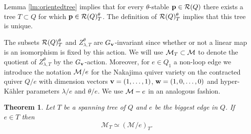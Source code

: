\documentclass{amsart}
\newtheorem{thm}{Theorem}[section]
\theoremstyle{definition}
\begin{document}
Lemma \ref{lm:orientedtree} implies that for every $\theta$-stable $\mathbf{p} \in \mathcal{R}(Q)$ there exists a tree $T \subset Q$ for which $\mathbf{p} \in \mathcal{R}(Q)_T^\theta$.
The definition of $\mathcal{R}(Q)_T^\theta$ implies that this tree is unique.

The subsets $\mathcal{R}(Q)_T^\theta$ and $Z_{\lambda,T}^\theta$ are $G_{\mathbf{v}}$-invariant since whether or not a linear map is an isomorphism is fixed by this action.
We will use $\mathcal{M}_T \subset \mathcal{M}$ to denote the quotient of $Z_{\lambda,T}^\theta$ by the $G_{\mathbf{v}}$-action.
Moreover, for $e\in Q_1$ a non-loop edge we introduce the notation $\mathcal{M}/e$ for the Nakajima quiver variety on the contracted quiver $Q/e$ with dimension vectors $\mathbf{v}= (1,\ldots,1)$, $\mathbf{w}= (1,0,\ldots,0)$ and hyper-K\"ahler parameters $\lambda/e$ and $\theta/e$.
We use $\mathcal{M}-e$ in an analogous fashion.

\begin{thm}\label{thm:contract}
Let $T$ be a spanning tree of $Q$ and $e$ be the biggest edge in $Q$. 
If $e \in T$ then $$\mathcal{M}_T \simeq (\mathcal{M}/e)_T.$$
\end{thm}
\end{document}
